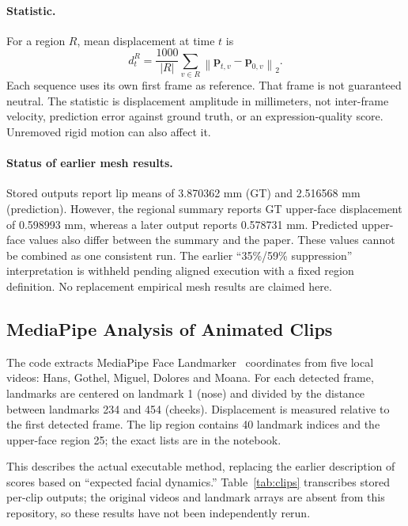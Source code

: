 \documentclass[10pt]{article}
\begin{document}
\paragraph{Statistic.}
For a region $R$, mean displacement at time $t$ is
\[
d_t^R = \frac{1000}{|R|}\sum_{v\in R}
\left\|\mathbf p_{t,v}-\mathbf p_{0,v}\right\|_2.
\]
Each sequence uses its own first frame as reference. That frame is not guaranteed
neutral. The statistic is displacement amplitude in millimeters, not inter-frame
velocity, prediction error against ground truth, or an expression-quality score.
Unremoved rigid motion can also affect it.

\paragraph{Status of earlier mesh results.}
Stored outputs report lip means of 3.870362 mm (GT) and 2.516568 mm (prediction).
However, the regional summary reports GT upper-face displacement of 0.598993 mm,
whereas a later output reports 0.578731 mm. Predicted upper-face values also differ
between the summary and the paper. These values cannot be combined as one
consistent run. The earlier ``35\%/59\% suppression'' interpretation is withheld
pending aligned execution with a fixed region definition. No replacement empirical
mesh results are claimed here.

\subsection{MediaPipe Analysis of Animated Clips}
The code extracts MediaPipe Face Landmarker~\cite{mediapipe} coordinates from
five local videos: Hans, Gothel, Miguel, Dolores and Moana. For each detected frame,
landmarks are centered on landmark 1 (nose) and divided by the distance between
landmarks 234 and 454 (cheeks). Displacement is measured relative to the first
detected frame. The lip region contains 40 landmark indices and the upper-face
region 25; the exact lists are in the notebook.

This describes the actual executable method, replacing the earlier description
of scores based on ``expected facial dynamics.'' Table~\ref{tab:clips} transcribes
stored per-clip outputs; the original videos and landmark arrays are absent from
this repository, so these results have not been independently rerun.
\end{document}
